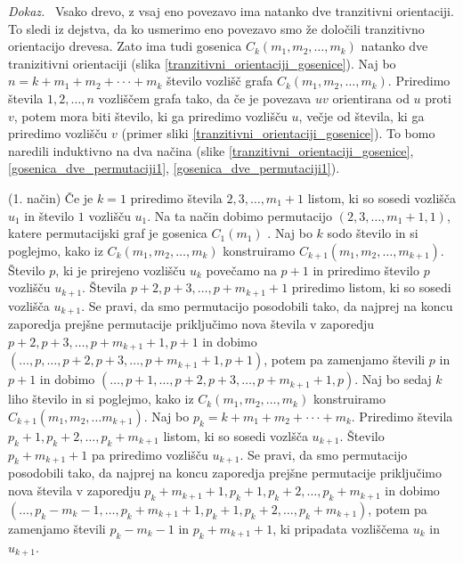 \documentclass[a4paper, 12pt]{book}
\newenvironment{dokaz}{\emph{Dokaz.}\ }{\hspace{\fill}{$\Box$}}
\begin{document}
\begin{dokaz}
    Vsako drevo, z vsaj eno povezavo ima natanko dve tranzitivni orientaciji. To sledi iz dejstva, da ko usmerimo eno povezavo smo že določili tranzitivno orientacijo drevesa. Zato ima tudi gosenica $C_k(m_1, m_2, \dots, m_k)$ natanko dve tranizitivni orientaciji (slika \ref{tranzitivni_orientaciji_gosenice}).
    Naj bo $n = k + m_1 + m_2 + \cdot\cdot\cdot + m_k$ število vozlišč grafa $C_k(m_1, m_2, \dots, m_k)$. Priredimo števila $1, 2, \dots, n$ vozliščem grafa tako, da če je povezava $uv$ orientirana od $u$ proti $v$, potem mora biti število, ki ga priredimo vozlišču $u$, večje od števila, ki ga priredimo vozlišču $v$ (primer sliki \ref{tranzitivni_orientaciji_gosenice}). To bomo naredili induktivno na dva načina (slike \ref{tranzitivni_orientaciji_gosenice}, \ref{gosenica_dve_permutaciji1}, \ref{gosenica_dve_permutaciji1}). 
    
    (1. način) Če je $k = 1$ priredimo števila $2, 3,\dots, m_1+1$ listom, ki so sosedi vozlišča $u_1$ in  število $1$ vozlišču $u_1$. Na ta način dobimo permutacijo $(2, 3,\dots, m_1+1, 1)$, katere permutacijski graf je gosenica $C_1(m_1)$ . Naj bo $k$ sodo število in si poglejmo, kako iz $C_k(m_1, m_2, \dots, m_k)$ konstruiramo $C_{k+1}(m_1, m_2, \dots, m_{k+1})$. Število $p$, ki je prirejeno vozlišču $u_k$ povečamo na $p+1$ in priredimo število $p$ vozlišču $u_{k+1}$. Števila $p+2, p+3, \dots, p+m_{k+1}+1$ priredimo listom, ki so sosedi vozlišča $u_{k+1}$. Se pravi, da smo permutacijo posodobili tako, da najprej na koncu zaporedja prejšne permutacije priključimo nova števila v zaporedju $p+2, p+3, \dots, p+m_{k+1}+1, p+1$ in dobimo $(\dots, p, \dots, p+2, p+3, \dots, p+m_{k+1}+1, p+1)$, potem pa zamenjamo števili $p$ in $p+1$ in dobimo $(\dots, p+1, \dots, p+2, p+3, \dots, p+m_{k+1}+1, p)$. Naj bo sedaj $k$ liho število in si poglejmo, kako iz $C_k(m_1, m_2, \dots, m_k)$ konstruiramo $C_{k+1}(m_1, m_2, \dots m_{k+1})$. Naj bo $p_k = k + m_1 + m_2 + \cdot\cdot\cdot + m_k$. Priredimo števila $p_k+1, p_k+2, \dots, p_k+m_{k+1}$ listom, ki so sosedi vozlšča $u_{k+1}$. Število $p_k+m_{k+1}+1$ pa priredimo vozlišču $u_{k+1}$. Se pravi, da smo permutacijo posodobili tako, da najprej na koncu zaporedja prejšne permutacije priključimo nova števila v zaporedju $p_k + m_{k+1} + 1, p_k+1, p_k+2, \dots,p_k+m_{k+1}$ in dobimo $(\dots, p_k - m_k - 1, \dots, p_k + m_{k+1} + 1, p_k+1, p_k+2,\dots,p_k+m_{k+1})$, potem pa zamenjamo števili $p_k - m_k - 1$ in $p_k + m_{k+1} + 1$, ki pripadata vozliščema $u_k$ in $u_{k+1}$. 


\end{dokaz}
\end{document}

